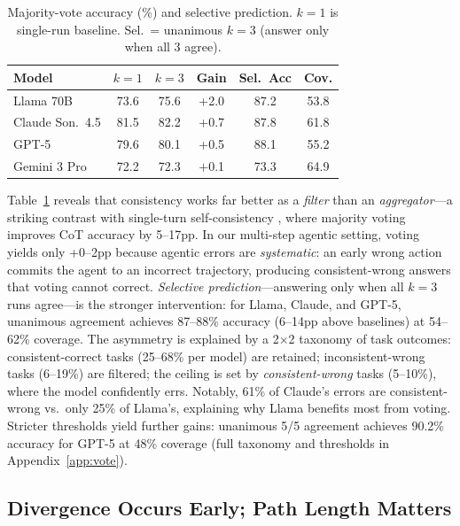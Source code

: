 \documentclass{article}
\begin{document}
\begin{table}[h]
\centering
\small
\caption{Majority-vote accuracy (\%) and selective prediction. $k\!=\!1$ is single-run baseline. Sel.\ = unanimous $k\!=\!3$ (answer only when all 3 agree).}
\label{tab:vote}
\begin{tabular}{l@{\hskip 5pt}c@{\hskip 5pt}c@{\hskip 5pt}c@{\hskip 5pt}c@{\hskip 5pt}c}
\toprule
\textbf{Model} & $k\!=\!1$ & $k\!=\!3$ & \textbf{Gain} & \textbf{Sel.\ Acc} & \textbf{Cov.} \\
\midrule
Llama 70B & 73.6 & 75.6 & +2.0 & 87.2 & 53.8 \\
Claude Son.\ 4.5 & 81.5 & 82.2 & +0.7 & 87.8 & 61.8 \\
GPT-5 & 79.6 & 80.1 & +0.5 & 88.1 & 55.2 \\
Gemini 3 Pro & 72.2 & 72.3 & $+$0.1 & 73.3 & 64.9 \\
\bottomrule
\end{tabular}
\end{table}

Table~\ref{tab:vote} reveals that consistency works far better as a \emph{filter} than an \emph{aggregator}---a striking contrast with single-turn self-consistency \citep{wang2022self}, where majority voting improves CoT accuracy by 5--17pp. In our multi-step agentic setting, voting yields only +0--2pp because agentic errors are \emph{systematic}: an early wrong action commits the agent to an incorrect trajectory, producing consistent-wrong answers that voting cannot correct. \emph{Selective prediction}---answering only when all $k\!=\!3$ runs agree---is the stronger intervention: for Llama, Claude, and GPT-5, unanimous agreement achieves 87--88\% accuracy (6--14pp above baselines) at 54--62\% coverage. The asymmetry is explained by a 2$\times$2 taxonomy of task outcomes: consistent-correct tasks (25--68\% per model) are retained; inconsistent-wrong tasks (6--19\%) are filtered; the ceiling is set by \emph{consistent-wrong} tasks (5--10\%), where the model confidently errs. Notably, 61\% of Claude's errors are consistent-wrong vs.\ only 25\% of Llama's, explaining why Llama benefits most from voting. Stricter thresholds yield further gains: unanimous 5/5 agreement achieves 90.2\% accuracy for GPT-5 at 48\% coverage (full taxonomy and thresholds in Appendix~\ref{app:vote}).

\subsection{Divergence Occurs Early; Path Length Matters}
\end{document}

